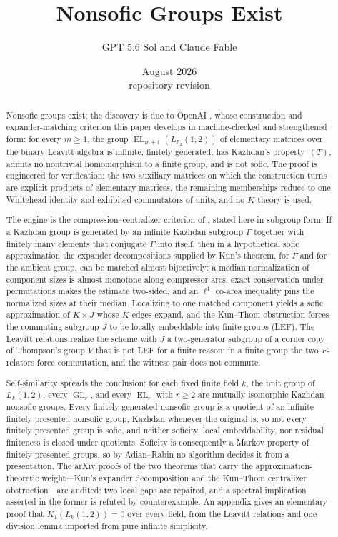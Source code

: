 \documentclass[11pt]{amsart}
\title{Nonsofic Groups Exist}
\author{GPT 5.6 Sol and Claude Fable}
\date{August 2026\ifanonymous\else\\[2pt]{\normalsize repository revision \texttt{\leanbreakable{\leancommit}}}\fi}
\theoremstyle{definition}
\theoremstyle{plain}
\newcommand{\F}{\mathbb F}
\newcommand{\GL}{\operatorname{GL}}
\newcommand{\EL}{\operatorname{EL}}
\begin{document}
\begin{abstract}
Nonsofic groups exist; the discovery is due to OpenAI \cite{OpenAI26}, whose construction and expander-matching criterion this paper develops in machine-checked and strengthened form: for every \(m\geq1\), the group \(\EL_{m+1}(L_{\F_2}(1,2))\) of elementary matrices over the binary Leavitt algebra is infinite, finitely generated, has Kazhdan's property~\((T)\), admits no nontrivial homomorphism to a finite group, and is not sofic.  The proof is engineered for verification: the two auxiliary matrices on which the construction turns are explicit products of elementary matrices, the remaining memberships reduce to one Whitehead identity and exhibited commutators of units, and no \(K\)-theory is used.

The engine is the compression--centralizer criterion of \cite{OpenAI26}, stated here in subgroup form.  If a Kazhdan group is generated by an infinite Kazhdan subgroup \(\Gamma\) together with finitely many elements that conjugate \(\Gamma\) into itself, then in a hypothetical sofic approximation the expander decompositions supplied by Kun's theorem, for \(\Gamma\) and for the ambient group, can be matched almost bijectively: a median normalization of component sizes is almost monotone along compressor arcs, exact conservation under permutations makes the estimate two-sided, and an \(\ell^1\) co-area inequality pins the normalized sizes at their median.  Localizing to one matched component yields a sofic approximation of \(K\times J\) whose \(K\)-edges expand, and the Kun--Thom obstruction forces the commuting subgroup \(J\) to be locally embeddable into finite groups (LEF).  The Leavitt relations realize the scheme with \(J\) a two-generator subgroup of a corner copy of Thompson's group \(V\) that is not LEF for a finite reason: in a finite group the two \(F\)-relators force commutation, and the witness pair does not commute.

Self-similarity spreads the conclusion: for each fixed finite field \(k\), the unit group of \(L_k(1,2)\), every \(\GL_r\), and every \(\EL_r\) with \(r\geq2\) are mutually isomorphic Kazhdan nonsofic groups.  Every finitely generated nonsofic group is a quotient of an infinite finitely presented nonsofic group, Kazhdan whenever the original is; so not every finitely presented group is sofic, and neither soficity, local embeddability, nor residual finiteness is closed under quotients.  Soficity is consequently a Markov property of finitely presented groups, so by Adian--Rabin no algorithm decides it from a presentation.  The arXiv proofs of the two theorems that carry the approximation-theoretic weight---Kun's expander decomposition and the Kun--Thom centralizer obstruction---are audited: two local gaps are repaired, and a spectral implication asserted in the former is refuted by counterexample.  An appendix gives an elementary proof that \(K_1(L_k(1,2))=0\) over every field, from the Leavitt relations and one division lemma imported from pure infinite simplicity.
\end{abstract}
\end{document}
